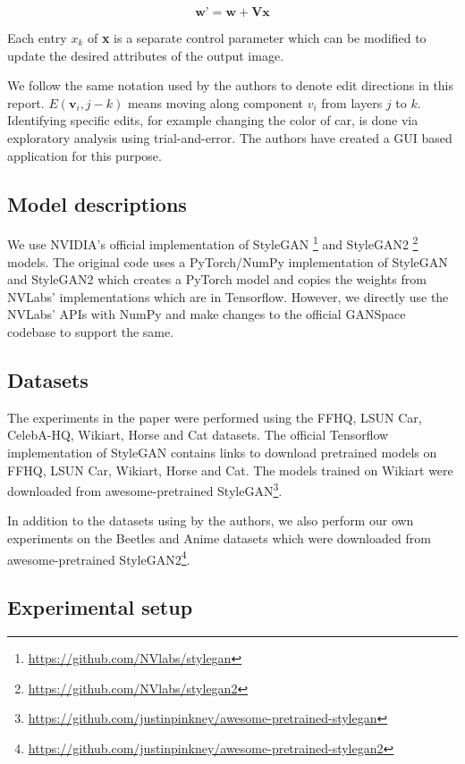 \begin{equation}
    \textbf{w'} = \textbf{w} + \textbf{Vx}
\end{equation}

Each entry $x_{k}$ of \textbf{x} is a separate control parameter which can be modified to update the desired attributes of the output image.

We follow the same notation used by the authors to denote edit directions in this report. $E(\textbf{v}_{i}, j-k)$ means moving along component $v_{i}$ from layers $j$ to $k$. Identifying specific edits, for example changing the color of car, is done via exploratory analysis using trial-and-error. The authors have created a GUI based application for this purpose.

\subsection{Model descriptions}

We use NVIDIA's official implementation of StyleGAN \footnote{\url{https://github.com/NVlabs/stylegan}} and StyleGAN2 \footnote{\url{https://github.com/NVlabs/stylegan2}} models.
The original code uses a PyTorch/NumPy implementation of StyleGAN and StyleGAN2 which creates a PyTorch model and copies the weights from NVLabs' implementations which are in Tensorflow. However, we directly use the NVLabs' APIs with NumPy and make changes to the official GANSpace codebase to support the same.

\subsection{Datasets}

The experiments in the paper were performed using the FFHQ, LSUN Car, CelebA-HQ, Wikiart, Horse and Cat datasets. The official Tensorflow implementation of StyleGAN contains links to download pretrained models on FFHQ, LSUN Car, Wikiart, Horse and Cat. The models trained on Wikiart were downloaded from awesome-pretrained StyleGAN\footnote{\url{https://github.com/justinpinkney/awesome-pretrained-stylegan}}.

In addition to the datasets using by the authors, we also perform our own experiments on the Beetles and Anime datasets which were downloaded from awesome-pretrained StyleGAN2\footnote{\url{https://github.com/justinpinkney/awesome-pretrained-stylegan2}}.


\subsection{Experimental setup}

